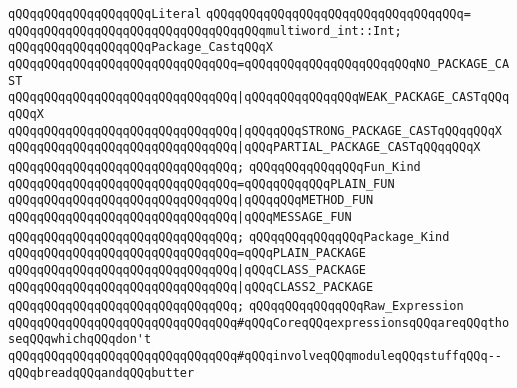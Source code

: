 \verb|qQQqqQQqqQQqqQQqqQQqLiteral|\newline
\verb|qQQqqQQqqQQqqQQqqQQqqQQqqQQqqQQqqQQq=|\newline
\verb|qQQqqQQqqQQqqQQqqQQqqQQqqQQqqQQqqQQqmultiword_int::Int;|\newline
\newline
\verb|qQQqqQQqqQQqqQQqqQQqPackage_CastqQQqX|\newline
\verb|qQQqqQQqqQQqqQQqqQQqqQQqqQQqqQQq=qQQqqQQqqQQqqQQqqQQqqQQqNO_PACKAGE_CAST|\newline
\verb|qQQqqQQqqQQqqQQqqQQqqQQqqQQqqQQq|\verb#|qQQqqQQqqQQqqQQqWEAK_PACKAGE_CASTqQQqqQQqX#\newline
\verb|qQQqqQQqqQQqqQQqqQQqqQQqqQQqqQQq|\verb#|qQQqqQQqSTRONG_PACKAGE_CASTqQQqqQQqX#\newline
\verb|qQQqqQQqqQQqqQQqqQQqqQQqqQQqqQQq|\verb#|qQQqPARTIAL_PACKAGE_CASTqQQqqQQqX#\newline
\verb|qQQqqQQqqQQqqQQqqQQqqQQqqQQqqQQq;|\newline
\newline
\verb|qQQqqQQqqQQqqQQqFun_Kind|\newline
\verb|qQQqqQQqqQQqqQQqqQQqqQQqqQQqqQQq=qQQqqQQqqQQqPLAIN_FUN|\newline
\verb|qQQqqQQqqQQqqQQqqQQqqQQqqQQqqQQq|\verb#|qQQqqQQqMETHOD_FUN#\newline
\verb|qQQqqQQqqQQqqQQqqQQqqQQqqQQqqQQq|\verb#|qQQqMESSAGE_FUN#\newline
\verb|qQQqqQQqqQQqqQQqqQQqqQQqqQQqqQQq;|\newline
\newline
\verb|qQQqqQQqqQQqqQQqPackage_Kind|\newline
\verb|qQQqqQQqqQQqqQQqqQQqqQQqqQQqqQQq=qQQqPLAIN_PACKAGE|\newline
\verb|qQQqqQQqqQQqqQQqqQQqqQQqqQQqqQQq|\verb#|qQQqCLASS_PACKAGE#\newline
\verb|qQQqqQQqqQQqqQQqqQQqqQQqqQQqqQQq|\verb#|qQQqCLASS2_PACKAGE#\newline
\verb|qQQqqQQqqQQqqQQqqQQqqQQqqQQqqQQq;|\newline
\newline
\verb|qQQqqQQqqQQqqQQqRaw_Expression|\newline
\newline
\verb|qQQqqQQqqQQqqQQqqQQqqQQqqQQqqQQq#qQQqCoreqQQqexpressionsqQQqareqQQqthoseqQQqwhichqQQqdon't|\newline
\verb|qQQqqQQqqQQqqQQqqQQqqQQqqQQqqQQq#qQQqinvolveqQQqmoduleqQQqstuffqQQq--qQQqbreadqQQqandqQQqbutter|\newline

